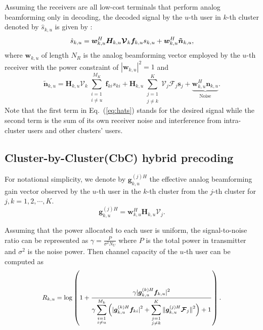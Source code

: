 \documentclass[conference]{IEEEtran}
\begin{document}
{Assuming the receivers are all low-cost terminals that perform analog beamforming only in decoding, the decoded signal by the $u$-th user in $k$-th cluster denoted by $\hat{s}_{k,u}$ is given by :
\begin{equation}{\label{eq:hats}}
\hat{s}_{k,u} = \bm{w}_{k,u}^H \bm{H}_{k,u} \bm{\mathcal{V}}_k \bm{f}_{k,u} s_{k,u} + \bm{w}_{k,u}^H \bm{\tilde{n}}_{k,u},
\end{equation}
where ${\bm w}_{k,u}$ of length $N_R$ is the analog beamforming vector employed by the $u$-th receiver with the power constraint of $|\bm{w}_{k,u}|^2=1$ and
\begin{equation}\label{Eq:ntilde}
\bm{\tilde{n}}_{k,u}=\bm{H}_{k,u} \bm{\mathcal{V}}_k\sum_{\substack{i=1 \\ i\neq u}}^{M_K}\bm{f}_{ki}s_{ki} + \bm{H}_{k,u}\sum_{\substack{j=1\\j\neq k}}^{K}\bm{\mathcal{V}}_j\bm{\mathcal{F}}_j\bm{s}_j+  \underbrace{\bm{w}_{k,u}^H \bm{n}_{k,u}}_\text{Noise}.
\end{equation}
Note that the first term in Eq.~(\ref{eq:hats}) stands for the desired signal while the second term is the sum of its own receiver noise and interference from intra-cluster users and other clusters' users.

\subsection{Cluster-by-Cluster(CbC) hybrid precoding}
For notational simplicity, we denote by ${\bm{g}}^{(j)H}_{k,u}$ the effective analog beamforming gain vector observed by the $u$-th user in the $k$-th cluster from the $j$-th cluster for $j,k=1,2,\cdots,K$.
\begin{equation}\label{eq:def}
{\bm{g}}^{(j)H}_{k,u} = \bm{w}^H_{k,u} \bm{H}_{k,u} \bm{\mathcal{V}}_{j}.
\end{equation}

Assuming that the power allocated to each user is uniform, the signal-to-noise ratio can be represented as $\gamma = \frac{P}{\sigma^2N_U}$ where $P$ is the total power in transmitter and $\sigma^2$ is the noise power. Then channel capacity of the $u$-th user can be computed as
\begin{equation}\small\label{eq:convenR}
R_{k,u} = \log\left(1+\frac{\gamma|{\bm{g}}_{k,u}^{(k)H} \bm{f}_{k,u}|^2}{\gamma\displaystyle\sum_{\substack{i=1 \\ i\neq u}}^{M_k}\Big(|{\bm{g}}_{k,u}^{(k)H}\bm{f}_{ki}|^2+\displaystyle\sum_{\substack{j=1\\j\neq k}}^{K}\|\bm{g}_{k,u}^{(j)H}\bm{\mathcal{F}}_j\|^2\Big)+1}\right).
\end{equation}

}
\end{document}
